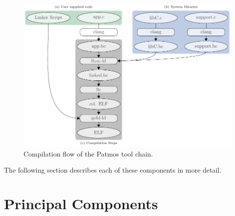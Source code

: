 \begin{figure}[t]
  \centering
  \includegraphics{fig/framework}

  \caption{Compilation flow of the Patmos tool chain.}
  \label{fig:framework}
\end{figure}

The following section describes each of these components in more detail.

\section{Principal Components}


